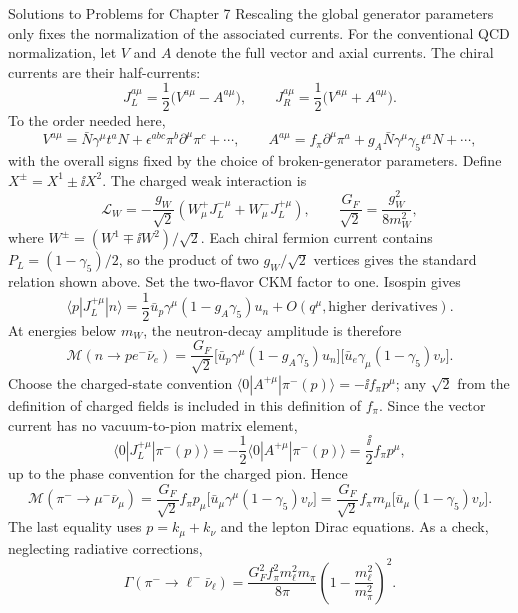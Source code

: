 \begin{bankssolutions}{Solutions to Problems for Chapter 7}
Rescaling the global generator parameters only fixes the normalization of
the associated currents.  For the conventional QCD normalization, let $V$
and $A$ denote the full
vector and axial currents.  The chiral currents are their half-currents:
\[
 J_L^{a\mu}=\frac12\bigl(V^{a\mu}-A^{a\mu}\bigr),\qquad
 J_R^{a\mu}=\frac12\bigl(V^{a\mu}+A^{a\mu}\bigr).
\]
To the order needed here,
\[
 V^{a\mu}=\bar N\gamma^\mu t^aN
 +\epsilon^{abc}\pi^b\partial^\mu\pi^c+\cdots,
 \qquad
 A^{a\mu}=f_\pi\partial^\mu\pi^a
 +g_A\bar N\gamma^\mu\gamma_5t^aN+\cdots,
\]
with the overall signs fixed by the choice of broken-generator parameters.
Define $X^\pm=X^1\pm\ii X^2$.  The charged weak interaction is
\[
 \mathcal L_W=-\frac{g_W}{\sqrt2}
 \left(W_\mu^+J_L^{-\mu}+W_\mu^-J_L^{+\mu}\right),
 \qquad
 \frac{G_F}{\sqrt2}=\frac{g_W^2}{8m_W^2},
\]
where $W^\pm=(W^1\mp\ii W^2)/\sqrt2$.  Each chiral fermion current
contains $P_L=(1-\gamma_5)/2$, so the product of two $g_W/\sqrt2$
vertices gives the standard relation shown above.  Set the two-flavor CKM
factor to one.  Isospin gives
\[
 \langle p|J_L^{+\mu}|n\rangle
 =\frac12\bar u_p\gamma^\mu(1-g_A\gamma_5)u_n
 +O(q^\mu,\text{higher derivatives}).
\]
At energies below $m_W$, the neutron-decay amplitude is therefore
\[
 \mathcal M(n\to p e^-\bar\nu_e)
 =\frac{G_F}{\sqrt2}
 \bigl[\bar u_p\gamma^\mu(1-g_A\gamma_5)u_n\bigr]
 \bigl[\bar u_e\gamma_\mu(1-\gamma_5)v_{\nu}\bigr].
\]
Choose the charged-state convention
$\langle0|A^{+\mu}|\pi^-(p)\rangle=-\ii f_\pi p^\mu$; any $\sqrt2$ from
the definition of charged fields is included in this definition of
$f_\pi$.  Since the vector current has no vacuum-to-pion matrix element,
\[
 \langle0|J_L^{+\mu}|\pi^-(p)\rangle
 =-\frac12\langle0|A^{+\mu}|\pi^-(p)\rangle
 =\frac{\ii}{2}f_\pi p^\mu,
\]
up to the phase convention for the charged pion.  Hence
\[
 \mathcal M(\pi^-\to\mu^-\bar\nu_\mu)
 =\frac{G_F}{\sqrt2}f_\pi p_\mu
 \bigl[\bar u_\mu\gamma^\mu(1-\gamma_5)v_\nu\bigr]
 =\frac{G_F}{\sqrt2}f_\pi m_\mu
 \bigl[\bar u_\mu(1-\gamma_5)v_\nu\bigr].
\]
The last equality uses $p=k_\mu+k_\nu$ and the lepton Dirac equations.  As
a check, neglecting radiative corrections,
\[
 \Gamma(\pi^-\to\ell^-\bar\nu_\ell)
 =\frac{G_F^2f_\pi^2m_\ell^2m_\pi}{8\pi}
 \left(1-\frac{m_\ell^2}{m_\pi^2}\right)^2.
\]


\end{bankssolutions}
